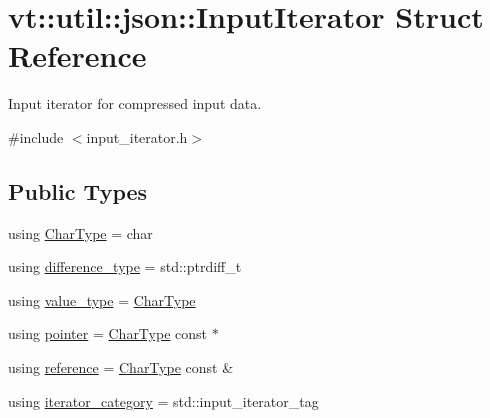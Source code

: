 \hypertarget{structvt_1_1util_1_1json_1_1_input_iterator}{}\section{vt\+:\+:util\+:\+:json\+:\+:Input\+Iterator Struct Reference}
\label{structvt_1_1util_1_1json_1_1_input_iterator}


Input iterator for compressed input data.  




{\ttfamily \#include $<$input\+\_\+iterator.\+h$>$}

\subsection*{Public Types}
\begin{DoxyCompactItemize}
\item 
using \hyperlink{structvt_1_1util_1_1json_1_1_input_iterator_ade8dadafc1ee3baa8ebf11bcfbb1efd4}{Char\+Type} = char
\item 
using \hyperlink{structvt_1_1util_1_1json_1_1_input_iterator_a8848ced4895e3d8c2cb9394e61cac30b}{difference\+\_\+type} = std\+::ptrdiff\+\_\+t
\item 
using \hyperlink{structvt_1_1util_1_1json_1_1_input_iterator_a5f85f8a6e8a9aded85bbc4927cdb754e}{value\+\_\+type} = \hyperlink{structvt_1_1util_1_1json_1_1_input_iterator_ade8dadafc1ee3baa8ebf11bcfbb1efd4}{Char\+Type}
\item 
using \hyperlink{structvt_1_1util_1_1json_1_1_input_iterator_a508d1d9795a5002f52471321197e4174}{pointer} = \hyperlink{structvt_1_1util_1_1json_1_1_input_iterator_ade8dadafc1ee3baa8ebf11bcfbb1efd4}{Char\+Type} const  $\ast$
\item 
using \hyperlink{structvt_1_1util_1_1json_1_1_input_iterator_ac178e9ca2ff42160d54fd0b9080c1d40}{reference} = \hyperlink{structvt_1_1util_1_1json_1_1_input_iterator_ade8dadafc1ee3baa8ebf11bcfbb1efd4}{Char\+Type} const  \&
\item 
using \hyperlink{structvt_1_1util_1_1json_1_1_input_iterator_aad0dbb52ba057b1f84bebfa6ca22a5e8}{iterator\+\_\+category} = std\+::input\+\_\+iterator\+\_\+tag
\end{DoxyCompactItemize}
